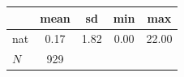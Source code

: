 {
\def\sym#1{\ifmmode^{#1}\else\(^{#1}\)\fi}
\begin{tabular}{l*{1}{cccc}}
\toprule
            &        mean&          sd&         min&         max\\
\midrule
nat         &        0.17&        1.82&        0.00&       22.00\\
\midrule
\(N\)       &         929&            &            &            \\
\bottomrule
\end{tabular}
}
